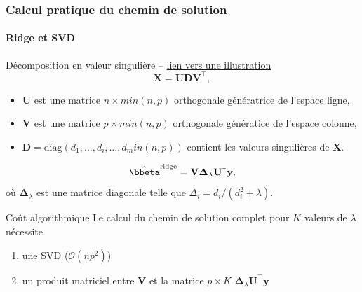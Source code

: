 \documentclass{beamer}\usepackage[]{graphicx}\usepackage[]{color}
\begin{document}
\begin{frame}
  \frametitle{Calcul pratique du chemin de solution}
  \framesubtitle{Ridge et SVD}

  \begin{block}{Décomposition en valeur singulière --
      \href{{http://upload.wikimedia.org/wikipedia/commons/e/e9/Singular_value_decomposition.gif}}{lien
        vers une illustration}}
    \begin{equation*}
      \mathbf{X} = \mathbf{U} \mathbf{D} \mathbf{V}^\intercal,
    \end{equation*}
    \vspace{-.5cm}
    \begin{itemize}
    \item  $\mathbf{U}$  est  une   matrice  $n\times  min(n,p)$  orthogonale
      génératrice de l'espace ligne,
    \item  $\mathbf{V}$  est  une   matrice  $p\times  min(n,p)$  orthogonale
      génératice de l'espace colonne,
    \item     $\mathbf{D}=     \mathrm{diag}(d_1,\dots,d_i,\dots,d_min(n,p))$
      contient les valeurs singulières de $\mathbf{X}$.
    \end{itemize}
  \end{block}

  \vfill

  \begin{equation*}
    \hat{\bbeta}^{\mathrm{ridge}}      =      \mathbf{V}
    {\boldsymbol\Delta}_\lambda \mathbf{U}^\intercal \mathbf{y},
  \end{equation*}
  où ${\boldsymbol\Delta}_\lambda$ est une matrice diagonale telle que
  $\Delta_i= d_i/(d_i^2+\lambda)$.

  \vfill

  \begin{block}{Coût algorithmique}
    Le calcul du chemin de solution complet pour $K$ valeurs de $\lambda$ nécessite
    \begin{enumerate}
    \item une SVD ($\mathcal{O}(np^2)$)
    \item un produit matriciel entre $\mathbf{V}$ et la matrice $p\times K$
          ${\boldsymbol\Delta}_\lambda     \mathbf{U}^\intercal
      \mathbf{y}$
    \end{enumerate}
  \end{block}
\end{frame}
\end{document}
